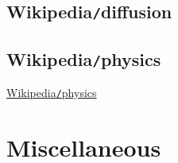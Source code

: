\documentclass{article}
\begin{document}
\subsection{Wikipedia{\tt/}diffusion}


\subsection{Wikipedia{\tt/}physics}
\href{https://en.wikipedia.org/wiki/Physics}{Wikipedia{\tt/}physics}



\section{Miscellaneous}


\printbibliography[heading=bibintoc]
	
\end{document}
